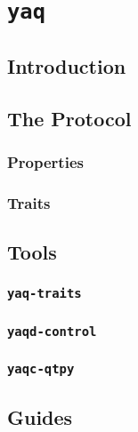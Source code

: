 \chapter{\texttt{yaq}} \label{cha:yaq}

\clearpage

\section{Introduction}  %

\clearpage

\section{The \yaq Protocol}  %


\subsection{Properties}

\subsection{Traits}

\clearpage

\section{Tools}

\subsection{\texttt{yaq-traits}}

\subsection{\texttt{yaqd-control}}

\subsection{\texttt{yaqc-qtpy}}

\clearpage

\section{Guides}

